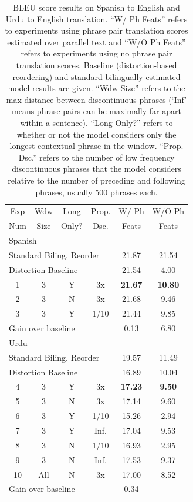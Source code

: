 \documentclass[11pt,letterpaper]{article}
\begin{document}
\begin{table}[t]
\begin{smaller}
\begin{center}
\begin{tabular}{|c|c|c|c|c|c|}
\hline
Exp & Wdw & Long & Prop.  & W/ Ph & W/O Ph \\
Num & Size & Only? &  Dsc. & Feats  & Feats \\
\hline
\multicolumn{6}{|l|}{Spanish} \\
\hline
\multicolumn{4}{|l|}{Standard Biling. Reorder} & 21.87 & 21.54 \\ 
\hline
\multicolumn{4}{|l|}{Distortion Baseline} & 21.54 & 4.00 \\ 
\hline
1 & 3 & Y & 3x & {\bf 21.67} & {\bf 10.80} \\
\hline
2 & 3 & N & 3x & 21.68 & 9.46 \\
3 & 3 & Y & 1/10 & 21.44 & 9.85 \\
\hline
\multicolumn{4}{|l|}{Gain over baseline} & 0.13 & 6.80 \\ 
\hline
\hline
\multicolumn{6}{|l|}{Urdu} \\
\hline
\multicolumn{4}{|l|}{Standard Biling. Reorder} & 19.57 & 11.49 \\ 
\hline
\multicolumn{4}{|l|}{Distortion Baseline} & 16.89 & 10.04 \\
\hline
4 & 3 & Y & 3x & {\bf 17.23} & {\bf 9.50} \\
\hline
5 & 3 & N & 3x & 17.14 & 9.60 \\
6 & 3 & Y & 1/10 & 15.26 & 2.94 \\
7 & 3 & Y & Inf. & 17.04 & 9.53 \\
8 & 3 & N & 1/10 & 16.93 & 2.95 \\
9 & 3 & N & Inf. & 17.53 & 9.37 \\
10 & All & N & 3x & 17.00 & 8.52 \\
\hline
\multicolumn{4}{|l|}{Gain over baseline} & 0.34 & - \\ 
\hline
\end{tabular}
\end{center}
\vskip -0.1in
\caption{\label{bleu-table}BLEU score results on Spanish to English and Urdu to English translation. ``W/ Ph Feats'' refers to experiments using phrase pair translation scores estimated over parallel text and ``W/O Ph Feats'' refers to experiments using no phrase pair translation scores. Baseline (distortion-based reordering) and standard bilingually estimated model results are given. ``Wdw Size'' refers to the max distance between discontinuous phrases (`Inf' means phrase pairs can be maximally far apart within a sentence). ``Long Only?'' refers to whether or not the model considers only the longest contextual phrase in the window. ``Prop. Dsc.'' refers to the number of low frequency discontinuous phrases that the model considers relative to the number of preceding and following phrases, usually 500 phrases each.}

\end{smaller}
\end{table}
\end{document}
